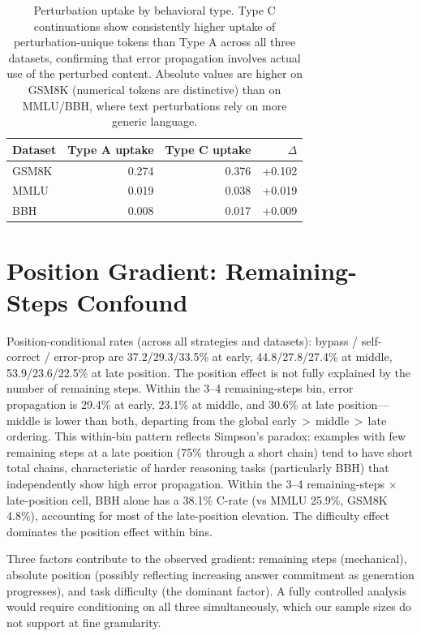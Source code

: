 \documentclass[10pt]{article} %
\begin{document}
\begin{table}[ht]
\caption{Perturbation uptake by behavioral type. Type C continuations show consistently higher uptake of perturbation-unique tokens than Type A across all three datasets, confirming that error propagation involves actual use of the perturbed content. Absolute values are higher on GSM8K (numerical tokens are distinctive) than on MMLU/BBH, where text perturbations rely on more generic language.}
\label{tab:uptake_app}
\begin{center}
\scriptsize
\begin{tabular}{lrrr}
\toprule
\textbf{Dataset} & \textbf{Type A uptake} & \textbf{Type C uptake} & \textbf{$\Delta$} \\
\midrule
GSM8K & 0.274 & 0.376 & +0.102 \\
MMLU & 0.019 & 0.038 & +0.019 \\
BBH & 0.008 & 0.017 & +0.009 \\
\bottomrule
\end{tabular}
\end{center}
\end{table}


\section{Position Gradient: Remaining-Steps Confound}
\label{app:position_confound}

Position-conditional rates (across all strategies and datasets): bypass / self-correct / error-prop are 37.2/29.3/33.5\% at early, 44.8/27.8/27.4\% at middle, 53.9/23.6/22.5\% at late position. The position effect is not fully explained by the number of remaining steps. Within the 3--4 remaining-steps bin, error propagation is 29.4\% at early, 23.1\% at middle, and 30.6\% at late position---middle is lower than both, departing from the global early\,$>$\,middle\,$>$\,late ordering. This within-bin pattern reflects Simpson's paradox: examples with few remaining steps at a late position (75\% through a short chain) tend to have short total chains, characteristic of harder reasoning tasks (particularly BBH) that independently show high error propagation. Within the 3--4 remaining-steps $\times$ late-position cell, BBH alone has a 38.1\% C-rate (vs MMLU 25.9\%, GSM8K 4.8\%), accounting for most of the late-position elevation. The difficulty effect dominates the position effect within bins.

Three factors contribute to the observed gradient: remaining steps (mechanical), absolute position (possibly reflecting increasing answer commitment as generation progresses), and task difficulty (the dominant factor). A fully controlled analysis would require conditioning on all three simultaneously, which our sample sizes do not support at fine granularity.
\end{document}
